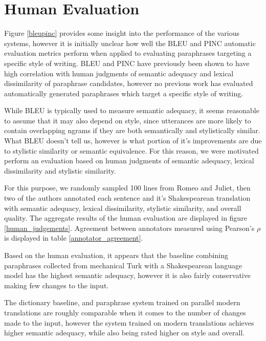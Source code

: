 \documentclass[10pt,a5paper,twoside]{article}
\begin{document}
\section{Human Evaluation}
\label{human_evaluation}
Figure \ref{bleupinc} provides some insight into the performance of the various systems, however it is initially unclear how well the BLEU and PINC
automatic evaluation metrics perform when applied to evaluating paraphrases targeting a specific style of writing.  BLEU and PINC have previously
been shown to have high correlation with human judgments of semantic adequacy and lexical dissimilarity of paraphrase candidates, however no
previous work has evaluated automatically generated paraphrases which target a specific style of writing.

While BLEU is typically used to measure semantic adequacy, it seems reasonable to assume that it may also depend on style, since utterances
are more likely to contain overlapping ngrams if they are both semantically and stylistically similar.  What BLEU doesn't tell us, however
is what portion of it's improvements are due to stylistic similarity or semantic equivalence.  For this reason, we were motivated perform
an evaluation based on human judgments of semantic adequacy, lexical dissimilarity and stylistic similarity.

For this purpose, we randomly sampled 100 lines from Romeo and Juliet, then two of the authors annotated each sentence and it's Shakespearean
translation with semantic adequacy, lexical dissimilarity, stylistic similarity, and overall quality.
The aggregate results of the human evaluation are displayed in figure \ref{human_judgements}.  Agreement between annotators
measured using Pearson's $\rho$ is displayed in table \ref{annotator_agreement}.

Based on the human evaluation, it appears that the baseline combining paraphrases collected from mechanical Turk \cite{chen11} with
a Shakespearean language model has the highest semantic adequacy, however it is also fairly conservative making few changes to the input.

The dictionary baseline, and paraphrase system trained on parallel modern translations are roughly comparable when it comes to 
the number of changes made to the input, however the system trained on modern translations achieves higher semantic adequacy, while also being rated higher on style and overall.
\end{document}
